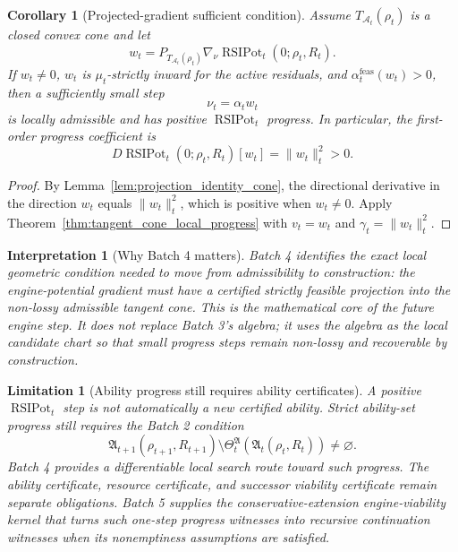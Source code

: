 \documentclass[11pt]{article}
\newtheorem{corollary}[theorem]{Corollary}
\newtheorem{interpretation}[theorem]{Interpretation}
\newtheorem{limitation}[theorem]{Limitation}
\newcommand{\1}{\mathbf{1}}
\begin{document}
\begin{corollary}[Projected-gradient sufficient condition]
\label{cor:projected_gradient_sufficient_condition}
Assume \(T_{\mathcal A_t}(\rho_t)\) is a closed convex cone and let
\[
w_t=P_{T_{\mathcal A_t}(\rho_t)}\nabla_\nu\operatorname{RSIPot}_t(0;\rho_t,R_t).
\]
If \(w_t\ne0\), \(w_t\) is \(\mu_t\)-strictly inward for the active residuals, and \(\alpha_t^{\mathrm{feas}}(w_t)>0\), then a sufficiently small step
\[
\nu_t=\alpha_t w_t
\]
is locally admissible and has positive \(\operatorname{RSIPot}_t\) progress.  In particular, the first-order progress coefficient is
\[
D\operatorname{RSIPot}_t(0;\rho_t,R_t)[w_t]=\|w_t\|_t^2>0.
\]
\end{corollary}

\begin{proof}
By Lemma~\ref{lem:projection_identity_cone}, the directional derivative in the direction \(w_t\) equals \(\|w_t\|_t^2\), which is positive when \(w_t\ne0\).  Apply Theorem~\ref{thm:tangent_cone_local_progress} with \(v_t=w_t\) and \(\gamma_t=\|w_t\|_t^2\).
\end{proof}

\begin{interpretation}[Why Batch 4 matters]
Batch 4 identifies the exact local geometric condition needed to move from admissibility to construction: the engine-potential gradient must have a certified strictly feasible projection into the non-lossy admissible tangent cone.  This is the mathematical core of the future engine step.  It does not replace Batch 3's algebra; it uses the algebra as the local candidate chart so that small progress steps remain non-lossy and recoverable by construction.
\end{interpretation}

\begin{limitation}[Ability progress still requires ability certificates]
A positive \(\operatorname{RSIPot}_t\) step is not automatically a new certified ability.  Strict ability-set progress still requires the Batch 2 condition
\[
\mathfrak A_{t+1}(\rho_{t+1},R_{t+1})
\setminus
\Theta_t^{\mathfrak A}(\mathfrak A_t(\rho_t,R_t))
\ne\varnothing.
\]
Batch 4 provides a differentiable local search route toward such progress.  The ability certificate, resource certificate, and successor viability certificate remain separate obligations. Batch 5 supplies the conservative-extension engine-viability kernel that turns such one-step progress witnesses into recursive continuation witnesses when its nonemptiness assumptions are satisfied.
\end{limitation}
\end{document}
